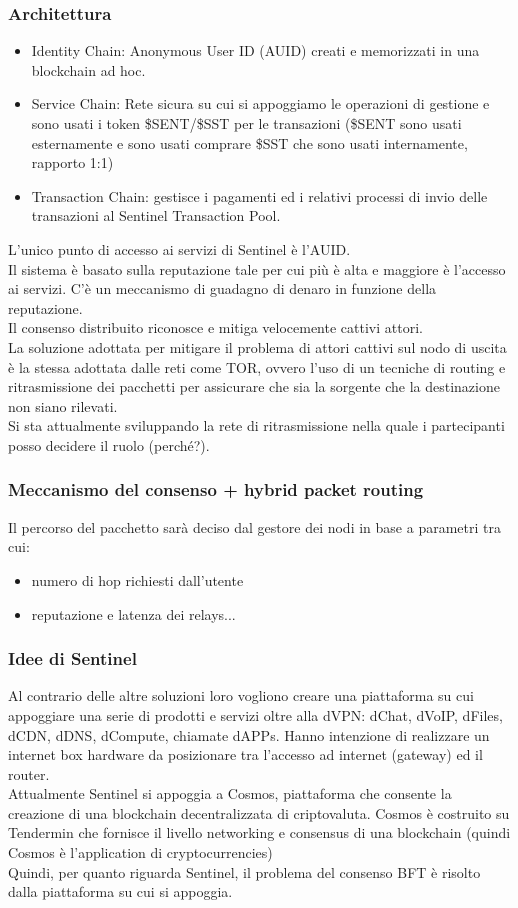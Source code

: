 \documentclass[]{article}
\begin{document}
	\subsubsection{Architettura}
	\begin{itemize}
	\item Identity Chain: Anonymous User ID (AUID) creati e memorizzati in una blockchain ad hoc.
	\item Service Chain: Rete sicura su cui si appoggiamo le operazioni di gestione e sono usati i token \$SENT/\$SST per le transazioni (\$SENT sono usati esternamente e sono usati comprare \$SST che sono usati internamente, rapporto 1:1)
	\item Transaction Chain: gestisce i pagamenti ed i relativi processi di invio delle transazioni al Sentinel Transaction Pool.
	\end{itemize}	
	L’unico punto di accesso ai servizi di Sentinel è l’AUID.\\
	Il sistema è basato sulla reputazione tale per cui più è alta e maggiore è l’accesso ai servizi. C’è un meccanismo di guadagno di denaro in funzione della reputazione.\\
	Il consenso distribuito riconosce e mitiga velocemente cattivi attori.\\
	La soluzione adottata per mitigare il problema di attori cattivi sul nodo di uscita è la stessa adottata dalle reti come TOR, ovvero l’uso di un tecniche di routing e ritrasmissione dei pacchetti per assicurare che sia la sorgente che la destinazione non siano rilevati.\\
	Si sta attualmente sviluppando la rete di ritrasmissione nella quale i partecipanti posso decidere il ruolo (perché?).	
	\subsubsection{Meccanismo del consenso + hybrid packet routing}	
	Il percorso del pacchetto sarà deciso dal gestore dei nodi in base a parametri tra cui:
	\begin{itemize}
		\item numero di hop richiesti dall’utente
		\item reputazione e latenza dei relays...
	\end{itemize}	
	\subsubsection{Idee di Sentinel}	
	Al contrario delle altre soluzioni loro vogliono creare una piattaforma su cui appoggiare una serie di prodotti e servizi oltre alla dVPN: dChat, dVoIP, dFiles, dCDN, dDNS, dCompute, chiamate dAPPs.
	Hanno intenzione di realizzare un internet box hardware da posizionare tra l’accesso ad internet (gateway) ed il router.\\	
	Attualmente Sentinel si appoggia a Cosmos, piattaforma che consente la creazione di una blockchain decentralizzata di criptovaluta. Cosmos è costruito su Tendermin che fornisce il livello networking e consensus di una blockchain (quindi Cosmos è l’application di cryptocurrencies)\\	
	Quindi, per quanto riguarda Sentinel, il problema del consenso BFT è risolto dalla piattaforma su cui si appoggia.
	
\end{document}
